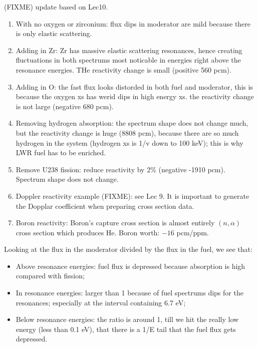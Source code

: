\documentclass{school-22.211-notes}
\date{March  7, 2012}
\begin{document}
\maketitle


\clearpage
{}
(FIXME) update based on Lec10. 
\begin{enumerate}
\item With no oxygen or zirconium: flux dips in moderator are mild because there is only elastic scattering. 
\item Adding in Zr: Zr has massive elastic scattering resonances, hence creating fluctuations in both spectrums most noticable in energies right above the resonance energies. THe reactivity change is small (positive 560 pcm).
\item Adding in O: the fast flux looks distorded in both fuel and moderator, this is because the oxygen xs has werid dips in high energy xs. the reactivity change is not large (negative 680 pcm). 
\item Removing hydrogen absorption: the spectrum shape does not change much, but the reactivity change is huge (8808 pcm), because there are so much hydrogen in the system (hydrogen xs is 1/v down to 100 keV); this is why LWR fuel has to be enriched. 
\item Remove U238 fission: reduce reactivity by 2\% (negative -1910 pcm). Spectrum shape does not change. 
\item Doppler reactivity example (FIXME): see Lec 9. It is important to generate the Dopplar coefficient when preparing cross section data. 
\item Boron reactivity: Boron's capture cross section is almost entirely $(n,\alpha)$ cross section which produces He. Boron worth: $-16$ pcm/ppm. 
\end{enumerate}

Looking at the flux in the moderator divided by the flux in the fuel, we see that:
\begin{itemize}
\item Above resonance energies: fuel flux is depressed because absorption is high compared with fission; 
\item In resonance energies: larger than 1 because of fuel spectrums dips for the resonances; especially at the interval containing 6.7 eV;
\item Below resonance energies: the ratio is around 1, till we hit the really low energy (less than 0.1 eV), that there is a 1/E tail that the fuel flux gets depressed. 
\end{itemize}
\end{document}
